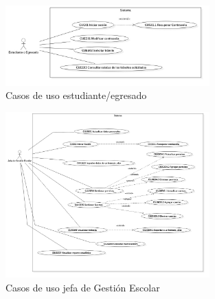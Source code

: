 \begin{figure}[htbp!]
    \centering
        \includegraphics[width=0.7\textwidth]{images/img_casos/Estudiante.jpg}
    \caption{Casos de uso estudiante/egresado}
\end{figure}

\begin{figure}[htbp!]
    \centering
        \includegraphics[width=0.7\textwidth]{images/img_casos/JefadeGestion.jpg}
    \caption{Casos de uso jefa de Gestión Escolar}
\end{figure}
